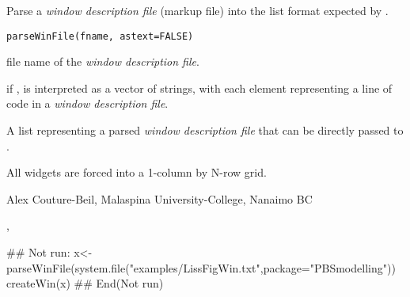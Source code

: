 \documentclass[letterpaper]{book}
\begin{document}
\begin{Description}\relax
Parse a \emph{window description file} (markup file) into 
the list format expected by .
\end{Description}
\begin{Usage}
\begin{verbatim}
parseWinFile(fname, astext=FALSE)
\end{verbatim}
\end{Usage}
\begin{Arguments}
\begin{ldescription}
\item[\code{fname}] file name of the \emph{window description file}.
\item[\code{astext}] if ,  is interpreted as a vector of strings, 
with each element representing a line of code in a \emph{window description file}.
\end{ldescription}
\end{Arguments}
\begin{Value}
A list representing a parsed \emph{window description file} that can be directly 
passed to .
\end{Value}
\begin{Note}\relax
All widgets are forced into a 1-column by N-row grid.
\end{Note}
\begin{Author}\relax
Alex Couture-Beil, Malaspina University-College, Nanaimo BC
\end{Author}
\begin{SeeAlso}\relax
{}, 
\end{SeeAlso}
\begin{Examples}
\begin{ExampleCode}
## Not run: 
x<-parseWinFile(system.file("examples/LissFigWin.txt",package="PBSmodelling"))
createWin(x)
## End(Not run)
\end{ExampleCode}
\end{Examples}
\end{document}
